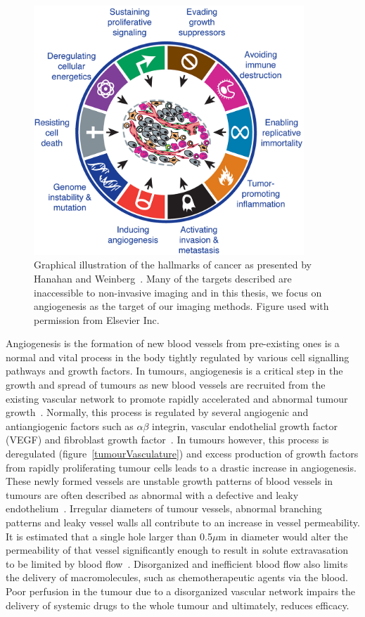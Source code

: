 \begin{figure}[htbp]   
 \begin{center}  
 \includegraphics[width=4in]{intro/./intro-images/cancerHallmarks.png}
 \caption{Graphical illustration of the hallmarks of cancer as presented by Hanahan and Weinberg~\cite{Hanahan:2011gu}. Many of the targets described are inaccessible to non-invasive imaging and in this thesis, we focus on angiogenesis as the target of our imaging methods. Figure used with permission from Elsevier Inc.}  
 \label{cancerHallmarks}  
 \end{center}
\end{figure}

Angiogenesis is the formation of new blood vessels from pre-existing ones is a normal and vital process in the body tightly regulated by various cell signalling pathways and growth factors.
In tumours, angiogenesis is a critical step in the growth and spread of tumours as new blood vessels are recruited from the existing vascular network to promote rapidly accelerated and abnormal tumour growth~\cite{Folkman:1990ud}.
Normally, this process is regulated by several angiogenic and antiangiogenic factors such as $\alpha \beta$ integrin, vascular endothelial growth factor (\acs{VEGF}) and fibroblast growth factor~\cite{Laking:2006ij}.
In tumours however, this process is deregulated (figure~\ref{tumourVasculature}) and excess production of growth factors from rapidly proliferating tumour cells leads to a drastic increase in angiogenesis.
These newly formed vessels are unstable growth patterns of blood vessels in tumours are often described as abnormal with a defective and leaky endothelium~\cite{McDonald:2002ut}.
Irregular diameters of tumour vessels, abnormal branching patterns and leaky vessel walls all contribute to an increase in vessel permeability.
It is estimated that a single hole larger than 0.5$\mu$m in diameter would alter the permeability of that vessel significantly enough to result in solute extravasation to be limited by blood flow~\cite{McDonald:2002ut}.
Disorganized and inefficient blood flow also limits the delivery of macromolecules, such as chemotherapeutic agents via the blood.
Poor perfusion in the tumour due to a disorganized vascular network impairs the delivery of systemic drugs to the whole tumour and ultimately, reduces efficacy.

